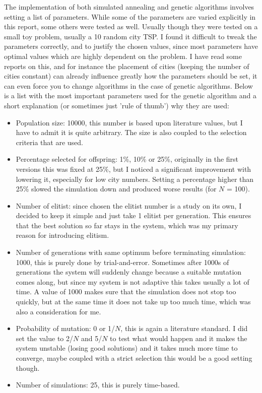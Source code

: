 \documentclass[10pt,a4paper]{article}
\begin{document}
The implementation of both simulated annealing and genetic algorithms involves setting a list of parameters. While some of the parameters are varied explicitly in this report, some others were tested as well. Usually though they were tested on a small toy problem, usually a 10 random city TSP. I found it difficult to tweak the parameters correctly, and to justify the chosen values, since most parameters have optimal values which are highly dependent on the problem. I have read some reports on this, and for instance the placement of cities (keeping the number of cities constant) can already influence greatly how the parameters should be set, it can even force you to change algorithms in the case of genetic algorithms. Below is a list with the most important parameters used for the genetic algorithm and a short explanation (or sometimes just 'rule of thumb') why they are used:

\begin{itemize}
\item 
  Population size: 10000, this number is based upon literature values, but I have to admit it is quite arbitrary. The size is also coupled to the selection criteria that are used.
\item
  Percentage selected for offspring: 1\%, 10\% or 25\%, originally in the first versions this was fixed at 25\%, but I noticed a significant improvement with lowering it, especially for low city numbers. Setting a percentage higher than 25\% slowed the simulation down and produced worse results (for $N$ = 100).
\item
  Number of elitist: since chosen the elitist number is a study on its own, I decided to keep it simple and just take 1 elitist per generation. This ensures that the best solution so far stays in the system, which was my primary reason for introducing elitism.
\item
  Number of generations with same optimum before terminating simulation: 1000, this is purely done by trial-and-error. Sometimes after 1000s of generations the system will suddenly change because a suitable mutation comes along, but since my system is not adaptive this takes usually a lot of time. A value of 1000 makes sure that the simulation does not stop too quickly, but at the same time it does not take up too much time, which was also a consideration for me.
\item
  Probability of mutation: 0 or 1/$N$, this is again a literature standard. I did set the value to 2/$N$ and 5/$N$ to test what would happen and it makes the system unstable (losing good solutions) and it takes much more time to converge, maybe coupled with a strict selection this would be a good setting though.
\item
  Number of simulations: 25, this is purely time-based.
\end{itemize}
\end{document}
